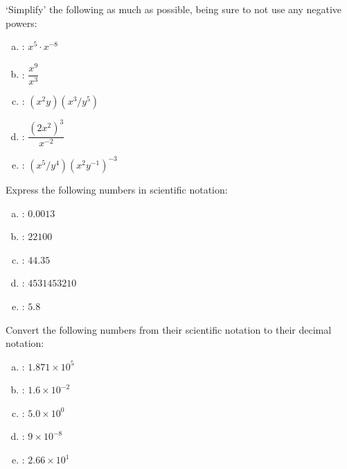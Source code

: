\documentclass[11pt,letterpaper]{article}
\begin{document}
 `Simplify' the following as much as possible, being sure to not use any negative powers: \pvspace{0.2cm}
\begin{enumerate}[(a)] \itemsep=2ex
\item {}: \qquad $x^5 \cdot x^{-8}$
\item {}: \qquad $\dfrac{x^9}{x^3}$
\item {}: \qquad $(x^2 y)(x^3/y^5)$
\item {}: \qquad $\dfrac{(2x^2)^3}{x^{-2}}$
\item {}: \qquad $(x^5/y^4)(x^2 y^{-1})^{-3}$
\end{enumerate}



\vfill



 Express the following numbers in scientific notation: \pvspace{0.2cm}
\begin{enumerate}[(a)] \itemsep=2ex
\item {}: \qquad $0.0013$
\item {}: \qquad $22100$
\item {}: \qquad $44.35$
\item {}: \qquad $4531453210$
\item {}: \qquad $5.8$
\end{enumerate}



\vfill



 Convert the following numbers from their scientific notation to their decimal notation: \pvspace{0.2cm}
\begin{enumerate}[(a)] \itemsep=2ex
\item {}: \qquad $1.871 \times 10^5$
\item {}: \qquad $1.6 \times 10^{-2}$
\item {}: \qquad $5.0 \times 10^0$
\item {}: \qquad $9 \times 10^{-8}$
\item {}: \qquad $2.66 \times 10^1$ 
\end{enumerate}


\end{document}
